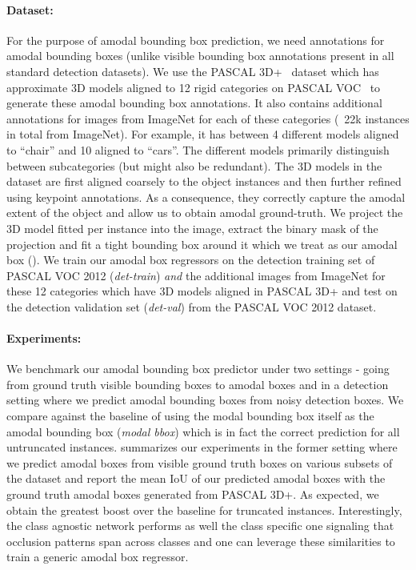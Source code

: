 \paragraph{Dataset:} For the purpose of amodal bounding box prediction, we need annotations for amodal bounding boxes (unlike visible bounding box annotations present in all standard detection datasets). We use the PASCAL 3D+~\cite{pascal3d} dataset which has approximate 3D models aligned to 12 rigid categories on PASCAL VOC~\cite{pascal-voc-2012} to generate these amodal bounding box annotations. It also contains additional annotations for images from ImageNet \cite{imagenet_cvpr09} for each of these categories (~22k instances in total from ImageNet). For example, it has between 4 different models aligned to ``chair'' and 10 aligned to ``cars''. The different models primarily distinguish between subcategories (but might also be redundant). The 3D models in the dataset are first aligned coarsely to the object instances and then further refined using keypoint annotations. As a consequence, they correctly capture the amodal extent of the object and allow us to obtain amodal ground-truth.  We project the 3D model fitted per instance into the image, extract the binary mask of the projection and fit a tight bounding box around it which we treat as our amodal box (). We train our amodal box regressors on the detection training set of PASCAL VOC 2012 (\textit{det-train}) \textit{and} the additional images from ImageNet for these 12 categories which have 3D models aligned in PASCAL 3D+ and test on the detection validation set (\textit{det-val}) from the PASCAL VOC 2012 dataset.

\paragraph{Experiments:} We benchmark our amodal bounding box predictor under two settings - going from ground truth visible bounding boxes to amodal boxes and in a detection setting where we predict amodal bounding boxes from noisy detection boxes. We compare against the baseline of using the modal bounding box itself as the amodal bounding box (\textit{modal bbox}) which is in fact the correct prediction for all untruncated instances.  summarizes our experiments in the former setting where we predict amodal boxes from visible ground truth boxes on various subsets of the dataset and report the mean IoU of our predicted amodal boxes with the ground truth amodal boxes generated from PASCAL 3D+. As expected, we obtain the greatest boost over the baseline for truncated instances. Interestingly, the class agnostic network performs as well the class specific one signaling that occlusion patterns span across classes and one can leverage these similarities to train a generic amodal box regressor. 

